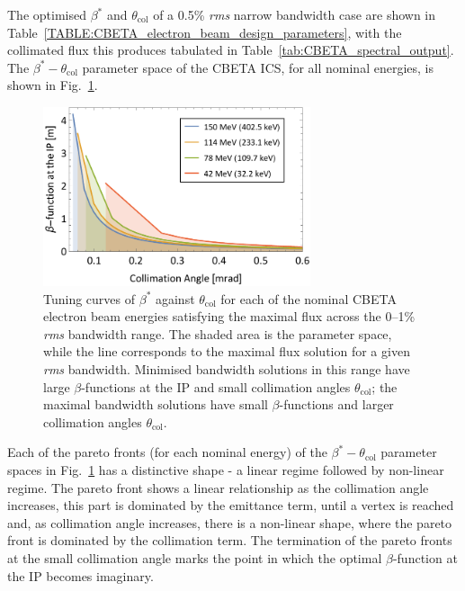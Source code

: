 \documentclass[../main.tex]{subfiles}
\begin{document}
The optimised $\beta^{*}$ and $\theta_{\mathrm{col}}$ of a 0.5\% \textit{rms} narrow bandwidth case are shown in Table~\ref{TABLE:CBETA_electron_beam_design_parameters}, with the collimated flux this produces tabulated in Table~\ref{tab:CBETA_spectral_output}. The $\beta^{*}-\theta_{\mathrm{col}}$ parameter space of the CBETA ICS, for all nominal energies, is shown in Fig.~\ref{fig:CBETA_beta_theta_parameter_space}.
\begin{figure}[!h]
\centering
\includegraphics[width=0.7\textwidth]{Figures/CBETA_Inverse_Compton_Source_Design/CBETABetaTheta.pdf}
\caption{Tuning curves of $\beta^{*}$ against $\theta_{\mathrm{col}}$ for each of the nominal CBETA electron beam energies satisfying the maximal flux across the 0--1\% \textit{rms} bandwidth range. The shaded area is the parameter space, while the line corresponds to the maximal flux solution for a given \textit{rms} bandwidth. Minimised bandwidth solutions in this range have large $\beta$-functions at the IP and small collimation angles $\theta_{\mathrm{col}}$; the maximal bandwidth solutions have small $\beta$-functions and larger collimation angles $\theta_{\mathrm{col}}$.}
\label{fig:CBETA_beta_theta_parameter_space}
\end{figure}

Each of the pareto fronts (for each nominal energy) of the $\beta^{*}-\theta_{\mathrm{col}}$ parameter spaces in Fig.~\ref{fig:CBETA_beta_theta_parameter_space} has a distinctive shape - a linear regime followed by non-linear regime. The pareto front shows a linear relationship as the collimation angle increases, this part is dominated by the emittance term, until a vertex is reached and, as collimation angle increases, there is a non-linear shape, where the pareto front is dominated by the collimation term. The termination of the pareto fronts at the small collimation angle marks the point in which the optimal $\beta$-function at the IP becomes imaginary.
\end{document}
